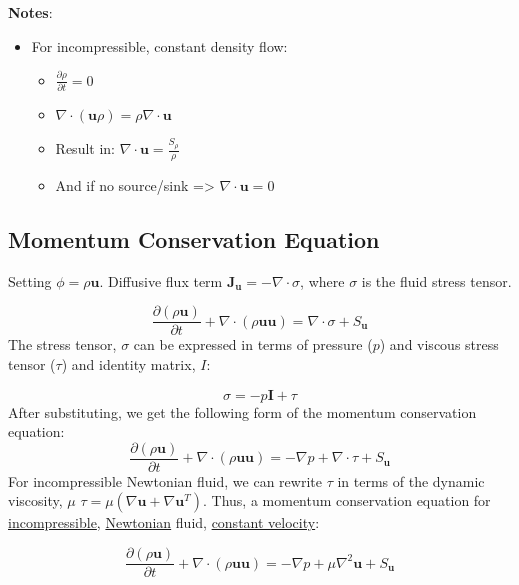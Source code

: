 \documentclass[11pt]{article}
\begin{document}
\textbf{Notes}:
\begin{itemize}
\item For incompressible, constant density flow:
\begin{itemize}
\item \(\frac{\partial \rho}{\partial t} = 0\)
\item \(\nabla \cdot (\textbf{u}\rho) = \rho \nabla \cdot \textbf{u}\)
\item Result in: \(\nabla \cdot \textbf{u} = \frac{S_\rho}{\rho}\)
\item And if no source/sink => \(\nabla \cdot \textbf{u} = 0\)
\end{itemize}
\end{itemize}

\subsection{Momentum Conservation Equation}
\label{sec:org59dc328}
Setting \(\phi = \rho \textbf{u}\). Diffusive flux term \(\textbf{J}_\textbf{u} = -\nabla \cdot \sigma\), where
\(\sigma\) is the fluid stress tensor. 

\begin{equation}
\frac{\partial (\rho \textbf{u})}{\partial t} + \nabla \cdot (\rho \textbf{uu})  = \nabla \cdot \sigma +
S_\textbf{u}
\end{equation}
The stress tensor, \(\sigma\) can be expressed in terms of pressure (\(p\)) and viscous stress tensor (\(\tau\))
and identity matrix, \(I\):

\begin{equation}
\sigma = -p\textbf{I} + \tau
\end{equation}
After substituting, we get the following form of the momentum conservation equation:
\begin{equation}
\frac{\partial (\rho \textbf{u})}{\partial t} + \nabla \cdot (\rho \textbf{uu})  = -\nabla p + \nabla \cdot \tau
+ S_\textbf{u}
\end{equation}
For incompressible Newtonian fluid, we can rewrite \(\tau\) in terms of the dynamic viscosity, \(\mu\)
\(\tau = \mu(\nabla \textbf{u}+\nabla \textbf{u}^T)\).  Thus, a momentum conservation equation for \uline{incompressible},
\uline{Newtonian} fluid, \uline{constant velocity}:

\begin{equation}
\frac{\partial (\rho \textbf{u})}{\partial t} + \nabla \cdot (\rho \textbf{uu})  = -\nabla p + \mu \nabla^2
\textbf{u} + S_\textbf{u}
\end{equation}
\end{document}
